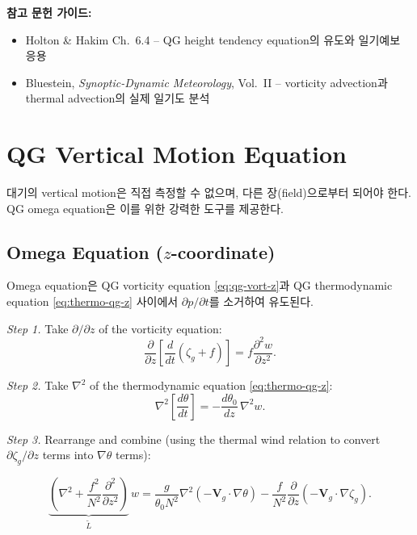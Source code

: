 \begin{hisublock}
\textbf{참고 문헌 가이드:}
\begin{itemize}
  \item Holton \& Hakim Ch.~6.4 -- QG height tendency equation의 유도와 일기예보 응용
  \item Bluestein, \textit{Synoptic-Dynamic Meteorology}, Vol.~II -- vorticity advection과 thermal advection의 실제 일기도 분석
\end{itemize}
\end{hisublock}


\section{QG Vertical Motion Equation}\label{sec:qg-omega-z}

대기의 vertical motion은 직접 측정할 수 없으며, 다른 장(field)으로부터
되어야 한다.  QG omega equation은 이를 위한
강력한 도구를 제공한다.

\subsection{Omega Equation ($z$-coordinate)}\label{subsec:omega-eq-z}

Omega equation은 QG vorticity equation \eqref{eq:qg-vort-z}과 QG thermodynamic
equation \eqref{eq:thermo-qg-z} 사이에서 $\partial p/\partial t$를 소거하여
유도된다.

\textit{Step 1.}  Take $\partial/\partial z$ of the vorticity equation:
\[
  \frac{\partial}{\partial z}\!\left[\frac{d}{dt}(\zeta_g + f)\right]
  = f\frac{\partial^2 w}{\partial z^2}.
\]

\textit{Step 2.}  Take $\nabla^2$ of the thermodynamic equation
\eqref{eq:thermo-qg-z}:
\[
  \nabla^2\!\left[\frac{d\theta}{dt}\right]
  = -\frac{d\theta_0}{dz}\,\nabla^2 w.
\]

\textit{Step 3.}  Rearrange and combine (using the thermal wind relation to
convert $\partial\zeta_g/\partial z$ terms into $\nabla\theta$ terms):

\begin{equation}\label{eq:omega-z}
  \boxed{
  \underbrace{
  \left(\nabla^2 + \frac{f^2}{N^2}\frac{\partial^2}{\partial z^2}\right)
  }_{\tilde{L}}\,w
  = \frac{g}{\theta_0 N^2}\nabla^2(-\mathbf{V}_g\cdot\nabla\theta)
    - \frac{f}{N^2}\frac{\partial}{\partial z}(-\mathbf{V}_g\cdot\nabla\zeta_g).
  }
\end{equation}

